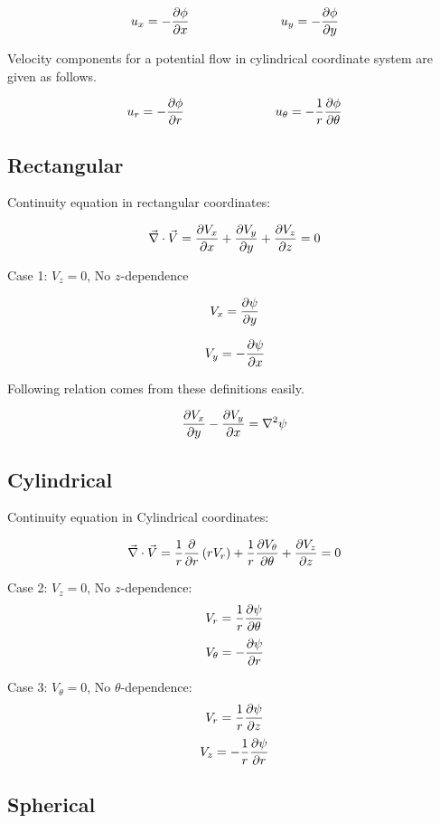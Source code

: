 $$ u_x = -{\partial \phi \over \partial x} \hspace{1 in} u_y = -{\partial \phi \over \partial y}$$

Velocity components for a potential flow in cylindrical coordinate system are given as follows.

$$ u_r = -{\partial \phi \over \partial r} \hspace{1 in} u_\theta = -{1 \over r}{\partial \phi \over \partial \theta}$$


\subsection{Rectangular}

Continuity equation in rectangular coordinates:

$$\vec{\nabla} \cdot \vec{V} = {\partial V_x \over \partial x} + {\partial V_y \over \partial y} + {\partial V_z \over \partial z} = 0$$

Case 1: $V_z = 0$, No $z$-dependence

$$V_x = {\partial \psi \over \partial y} $$

$$V_y = - {\partial \psi \over \partial x} $$

Following relation comes from these definitions easily.

$$ {\partial V_x \over \partial y} - {\partial V_y \over \partial x} = \nabla^2 \psi$$

\subsection{Cylindrical}

Continuity equation in Cylindrical coordinates:

$$ \vec{\nabla} \cdot \vec{V} = {1 \over r} {\partial \over \partial r} \left( r V_r \right) + {1 \over r} {\partial V_\theta \over \partial \theta} + {\partial V_z \over \partial z} = 0 $$

Case 2: $V_z = 0$, No $z$-dependence:
 $$ V_r = {1 \over r} {\partial \psi \over \partial \theta} $$
 $$ V_\theta = - {\partial \psi \over \partial r} $$


Case 3: $V_\theta = 0$, No $\theta$-dependence:
 $$ V_r = {1 \over r} {\partial \psi \over \partial z} $$
 $$ V_z = -{1 \over r} {\partial \psi \over \partial r} $$



\subsection{Spherical}

